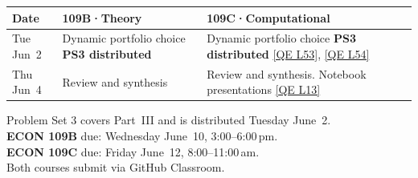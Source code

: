 \begin{tabularx}{\textwidth}{@{}p{2.1cm}YY@{}}
\toprule
\textbf{Date} & \textbf{109B\enspace·\enspace Theory} & \textbf{109C\enspace·\enspace Computational} \\
\midrule
Tue Jun~2 &
Dynamic portfolio choice \newline \textbf{PS3 distributed} &
Dynamic portfolio choice \newline \textbf{PS3 distributed} \newline
\href{https://julia.quantecon.org/multi_agent_models/markov_asset.html}{[QE L53]},
\href{https://julia.quantecon.org/multi_agent_models/lucas_model.html}{[QE L54]} \\[4pt]
Thu Jun~4 &
Review and synthesis &
Review and synthesis. Notebook presentations \newline
\href{https://julia.quantecon.org/software_engineering/testing.html}{[QE L13]} \\
\bottomrule
\end{tabularx}

\begin{calloutimportant}[PS3 / Final]
Problem Set 3 covers Part~III and is distributed Tuesday June~2.\\[0.3em]
\textbf{ECON 109B} due: Wednesday June~10, 3:00--6:00\,pm.\\
\textbf{ECON 109C} due: Friday June~12, 8:00--11:00\,am.\\[0.3em]
Both courses submit via GitHub Classroom.
\end{calloutimportant}